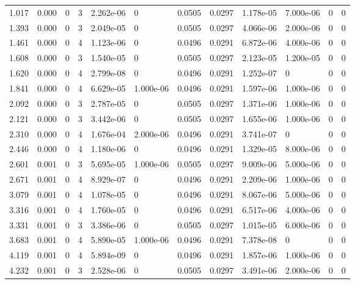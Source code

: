 \documentclass[preview]{standalone}
\begin{document}
{{\begin{tabular}{L{1.2cm}C{1.2cm} C{0.3cm}C{0.5cm} C{1.4cm}C{1.4cm} C{1.4cm}C{1.4cm} C{1.6cm}C{1.6cm} C{1.6cm}C{1.6cm}}
  1.017  &  0.000  & 0     &  3 &  2.262e-06  & 0  &  0.0505&   0.0297& 1.178e-05 & 7.000e-06   &  0 & 0  \\ 
  1.393  &  0.000  & 0     &  3 &  2.049e-05  & 0  &  0.0505&   0.0297& 4.066e-06 & 2.000e-06   &  0 & 0  \\ 
  1.461  &  0.000  & 0     &  4 &  1.123e-06  & 0  &  0.0496&   0.0291& 6.872e-06 & 4.000e-06   &  0 & 0  \\ 
  1.608  &  0.000  & 0     &  3 &  1.540e-05  & 0  &  0.0505&   0.0297& 2.123e-05 & 1.200e-05   &  0 & 0  \\ 
  1.620  &  0.000  & 0     &  4 &  2.799e-08  & 0  &  0.0496&   0.0291& 1.252e-07 & 0   &  0 & 0  \\ 
  1.841  &  0.000  & 0     &  4 &  6.629e-05  & 1.000e-06  &  0.0496&   0.0291& 1.597e-06 & 1.000e-06   &  0 & 0  \\ 
  2.092  &  0.000  & 0     &  3 &  2.787e-05  & 0  &  0.0505&   0.0297& 1.371e-06 & 1.000e-06   &  0 & 0  \\ 
  2.121  &  0.000  & 0     &  3 &  3.442e-06  & 0  &  0.0505&   0.0297& 1.655e-06 & 1.000e-06   &  0 & 0  \\ 
  2.310  &  0.000  & 0     &  4 &  1.676e-04  & 2.000e-06  &  0.0496&   0.0291& 3.741e-07 & 0   &  0 & 0  \\ 
  2.446  &  0.000  & 0     &  4 &  1.180e-06  & 0  &  0.0496&   0.0291& 1.329e-05 & 8.000e-06   &  0 & 0  \\ 
  2.601  &  0.001  & 0     &  3 &  5.695e-05  & 1.000e-06  &  0.0505&   0.0297& 9.009e-06 & 5.000e-06   &  0 & 0  \\ 
  2.671  &  0.001  & 0     &  4 &  8.929e-07  & 0  &  0.0496&   0.0291& 2.209e-06 & 1.000e-06   &  0 & 0  \\ 
  3.079  &  0.001  & 0     &  4 &  1.078e-05  & 0  &  0.0496&   0.0291& 8.067e-06 & 5.000e-06   &  0 & 0  \\ 
  3.316  &  0.001  & 0     &  4 &  1.760e-05  & 0  &  0.0496&   0.0291& 6.517e-06 & 4.000e-06   &  0 & 0  \\ 
  3.331  &  0.001  & 0     &  3 &  3.386e-06  & 0  &  0.0505&   0.0297& 1.015e-05 & 6.000e-06   &  0 & 0  \\ 
  3.683  &  0.001  & 0     &  4 &  5.890e-05  & 1.000e-06  &  0.0496&   0.0291& 7.378e-08 & 0   &  0 & 0  \\ 
  4.119  &  0.001  & 0     &  4 &  5.894e-09  & 0  &  0.0496&   0.0291& 1.857e-06 & 1.000e-06   &  0 & 0  \\ 
  4.232  &  0.001  & 0     &  3 &  2.528e-06  & 0  &  0.0505&   0.0297& 3.491e-06 & 2.000e-06   &  0 & 0  \\ 

\end{tabular}}}
\end{document}
